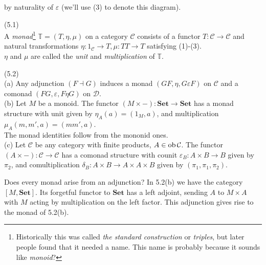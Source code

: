 \documentclass[a4paper]{article}
\begin{document}
by naturality of $\varepsilon$ (we'll use (3) to denote this diagram).

\begin{defi} (5.1)\\
    A \emph{monad}\footnote{Historically this was called \emph{the standard construction} or \emph{triples}, but later people found that it needed a name. This name is probably because it sounds like \emph{monoid}?} $\mathbb{T} = (T,\eta,\mu)$ on a category $\mathcal{C}$ consists of a functor $T:\mathcal{C} \to \mathcal{C}$ and natural transformations $\eta:1_{\mathcal{C}} \to T, \mu:TT \to T$ satisfying (1)-(3).\\
    $\eta$ and $\mu$ are called the \emph{unit} and \emph{multiplication} of $\mathbb{T}$.
\end{defi}

\begin{eg} (5.2)\\
    (a) Any adjunction $(F \dashv G)$ induces a monad $(GF,\eta,G\varepsilon F)$ on $\mathcal{C}$ and a comonad $(FG,\varepsilon, F\eta G)$ on $\mathcal{D}$.\\
    (b) Let $M$ be a monoid. The functor $(M \times -): \mathbf{Set} \to \mathbf{Set}$ has a monad structure with unit given by $\eta_A(a) = (1_M,a)$, and multiplication $\mu_A(m,m',a) = (mm',a)$.\\
    The monad identities follow from the mononid ones.\\
    (c) Let $\mathcal{C}$ be any category with finite products, $A \in \operatorname{ob}\mathcal{C}$. The functor $(A \times -):\mathcal{C} \to \mathcal{C}$ has a comonad structure with counit $\varepsilon_B: A \times B \to B$ given by $\pi_2$, and comultiplication $\delta_B:A \times B \to A \times A \times B$ given by $(\pi_1,\pi_1,\pi_2)$.
\end{eg}

Does every monad arise from an adjunction? In 5.2(b) we have the category $[M,\mathbf{Set}]$. Its forgetful functor to $\mathbf{Set}$ has a left adjoint, sending $A$ to $M \times A$ with $M$ acting by multiplication on the left factor. This adjunction gives rise to the monad of 5.2(b).
\end{document}
